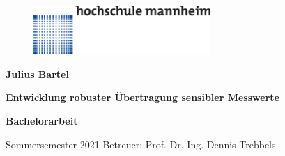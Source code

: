 \begin{titlepage}
\thispagestyle{empty}
\begin{center}


\begin{figure}[h]
    \centering
        
       \includegraphics[width=0.6\textwidth]{Pictures/hm_4C_L_1-4.eps}
    
 \end{figure}





\vspace*{2.5cm}
\begin{LARGE}
\textbf{Julius Bartel}
\end{LARGE}

\bigskip

\begin{Huge} 
\textbf{Entwicklung robuster Übertragung sensibler Messwerte}
\end{Huge}


\par\bigskip

\begin{large}
    \textbf{Bachelorarbeit}
\end{large}

\vspace{12cm}
Sommersemester 2021 Betreuer: Prof. Dr.-Ing. Dennis Trebbels




\end{center}

\end{titlepage}
